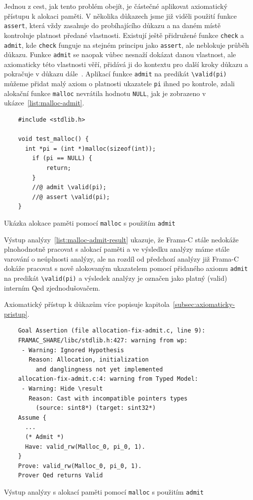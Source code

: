 Jednou z cest, jak tento problém obejít,
je částečné aplikovat axiomatický přístupu k alokaci paměti.
V několika důkazech jsme již viděli použití funkce \texttt{assert},
která vždy zasahuje do probíhajícího důkazu a na daném místě kontroluje platnost předané vlastnosti.
Existují ještě přidružené funkce \texttt{check} a \texttt{admit},
kde \texttt{check} funguje na stejném principu jako \texttt{assert},
ale neblokuje průběh důkazu.
Funkce \texttt{admit} se naopak vůbec nesnaží dokázat danou vlastnost,
ale axiomaticky této vlastnosti věří, přidává ji do kontextu pro další kroky důkazu
a pokračuje v důkazu dále~\cite{ACSLSpec}.
Aplikací funkce \texttt{admit} na predikát \texttt{\textbackslash valid(pi)}
můžeme přidat malý axiom o platnosti ukazatele \texttt{pi} ihned po kontrole,
zdali alokační funkce \texttt{malloc} nevrátila hodnotu \texttt{NULL},
jak je zobrazeno v ukázce~\ref{list:malloc-admit}.

\begin{listing}[H]
    \begin{verbatim}
    #include <stdlib.h>

    void test_malloc() {
      int *pi = (int *)malloc(sizeof(int));
        if (pi == NULL) {
            return;
        }
        //@ admit \valid(pi);
        //@ assert \valid(pi);
    }
    \end{verbatim}
    \caption{Ukázka alokace paměti pomocí \texttt{malloc} s použitím \texttt{admit}}
    \label{list:malloc-admit}
\end{listing}

Výstup analýzy~\ref{list:malloc-admit-result} ukazuje,
že Frama\mbox{-}C stále nedokáže plnohodnotně pracovat s alokací paměti
a ve výsledku analýzy máme stále varování o neúplnosti analýzy,
ale na rozdíl od předchozí analýzy již Frama\mbox{-}C dokáže pracovat
s nově alokovaným ukazatelem pomocí přidaného axiomu \texttt{admit} na predikát \texttt{\textbackslash valid(pi)}
a výsledek analýzy je označen jako platný (valid) interním Qed zjednodušovačem.

Axiomatický přístup k důkazům více popisuje kapitola~\ref{subsec:axiomaticky-pristup}.

\begin{listing}[H]
    \begin{verbatim}
    Goal Assertion (file allocation-fix-admit.c, line 9):
    FRAMAC_SHARE/libc/stdlib.h:427: warning from wp:
     - Warning: Ignored Hypothesis
       Reason: Allocation, initialization
         and danglingness not yet implemented
    allocation-fix-admit.c:4: warning from Typed Model:
     - Warning: Hide \result
       Reason: Cast with incompatible pointers types
         (source: sint8*) (target: sint32*)
    Assume {
      ...
      (* Admit *)
      Have: valid_rw(Malloc_0, pi_0, 1).
    }
    Prove: valid_rw(Malloc_0, pi_0, 1).
    Prover Qed returns Valid
    \end{verbatim}
    \caption{Výstup analýzy s alokací paměti pomocí \texttt{malloc} s použitím \texttt{admit}}
    \label{list:malloc-admit-result}
\end{listing}

